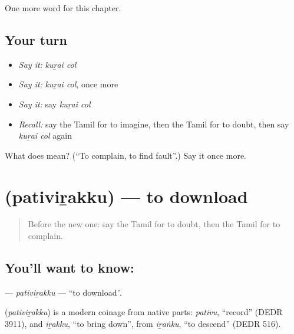\begin{grammarlens}[title={What you've built}]
One more word for this chapter.
\end{grammarlens}

\subsection*{Your turn}
\begin{itemize}
\raggedright
  \item \emph{Say it:} \emph{kuṟai col}
  \item \emph{Say it:} \emph{kuṟai col}, once more
  \item \emph{Say it:} say \emph{kuṟai col}
  \item \emph{Recall:} say the Tamil for to imagine, then the Tamil for to doubt, then say \emph{kuṟai col} again
\end{itemize}

\begin{tcolorbox}[breakable,colback=teal!4,colframe=teal!35!black,title={Before you move on}]
What does   mean? (\textquotedblleft{}To complain, to find fault\textquotedblright{}.) Say it once more.
\end{tcolorbox}
\section[\texorpdfstring{\ta{பதிவிறக்கு} (pativiṟakku)}{பதிவிறக்கு (pativiṟakku)}]{ (pativiṟakku) — to download}

\label{lesson:TA-C230-pativirakku}



\begin{quote}
Before the new one: say the Tamil for to doubt, then the Tamil for to complain.
\end{quote}

\subsection*{You'll want to know: }
\textbf{} — \emph{pativiṟakku} — \textquotedblleft{}to download\textquotedblright{}.

\begin{cousinweb}
\textbf{} (\emph{pativiṟakku}) is a modern coinage from native parts: \emph{pativu}, \textquotedblleft{}record\textquotedblright{} (DEDR 3911), and \emph{iṟakku}, \textquotedblleft{}to bring down\textquotedblright{}, from \emph{iṟaṅku}, \textquotedblleft{}to descend\textquotedblright{} (DEDR 516).
\end{cousinweb}

